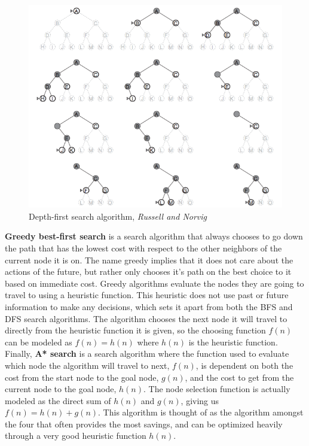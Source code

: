 \documentclass[titlepage]{article}
\begin{document}
\newpage

\begin{figure}[h!]
\includegraphics[width=\linewidth]{dfs.png}
\caption{Depth-first search algorithm, \textit{Russell and Norvig}}
\label{fig:DFSdiagram1}
\end{figure}

\noindent
\textbf{Greedy best-first search} is a search algorithm that always chooses to go down the path that has the lowest cost with respect to the other neighbors of the current node it is on. The name greedy implies that it does not care about the actions of the future, but rather only chooses it's path on the best choice to it based on immediate cost. Greedy algorithms evaluate the nodes they are going to travel to using a heuristic function. This heuristic does not use past or future information to make any decisions, which sets it apart from both the BFS and DFS search algorithms. The algorithm chooses the next node it will travel to directly from the heuristic function it is given, so the choosing function \(f(n)\) can be modeled as \(f(n) = h(n)\) where \(h(n)\) is the heuristic function.\newline
\newline
Finally, \textbf{A* search} is a search algorithm where the function used to evaluate which node the algorithm will travel to next, \(f(n)\), is dependent on both the cost from the start node to the goal node, \(g(n)\), and the cost to get from the current node to the goal node, \(h(n)\). The node selection function is actually modeled as the direct sum of \(h(n)\) and \(g(n)\), giving us \(f(n) = h(n) + g(n)\). This algorithm is thought of as the algorithm amongst the four that often provides the most savings, and can be optimized heavily through a very good heuristic function \(h(n)\).
\end{document}
